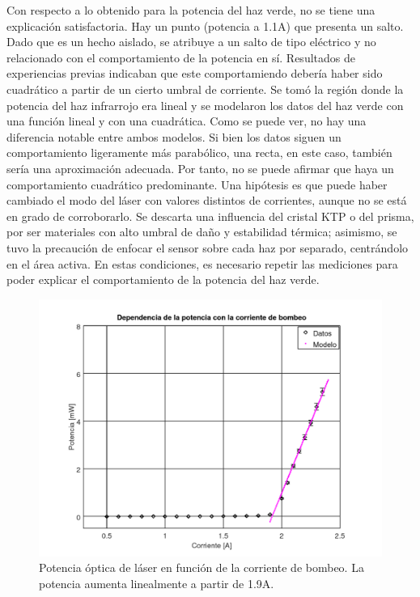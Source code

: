 \documentclass[10pt, a4paper]{article}%
\begin{document}
\begin{multicols}{2}
Con respecto a lo obtenido para la potencia del haz verde, no se tiene una explicación satisfactoria. Hay un punto (potencia a 1.1A) que presenta un salto. Dado que es un hecho aislado, se atribuye a un salto de tipo eléctrico y no relacionado con el comportamiento de la potencia en sí. Resultados de experiencias previas indicaban que este comportamiendo debería haber sido cuadrático a partir de un cierto umbral de corriente. Se tomó la región donde la potencia del haz infrarrojo era lineal y se modelaron los datos del haz verde con una función lineal y con una cuadrática. Como se puede ver, no hay una diferencia notable entre ambos modelos. Si bien los datos siguen un comportamiento ligeramente más parabólico, una recta, en este caso, también sería una aproximación adecuada. Por tanto, no se puede afirmar que haya un comportamiento cuadrático predominante. Una hipótesis es que puede haber cambiado el modo del láser con valores distintos de corrientes, aunque no se está en grado de corroborarlo. Se descarta una influencia del cristal KTP o del prisma, por ser materiales con alto umbral de daño y estabilidad térmica; asimismo, se tuvo la precaución de enfocar el sensor sobre cada haz por separado, centrándolo en el área activa. En estas condiciones, es necesario repetir las mediciones para poder explicar el comportamiento de la potencia del haz verde.







\begin{figure}[H]
    \centering
    \includegraphics[scale=0.4]{Graficos/potvscor.png}
    \caption{Potencia óptica de láser en función de la corriente de bombeo. La potencia aumenta linealmente a partir de 1.9A.}
    \label{laservscorr}
\end{figure}


\end{multicols}
\end{document}
